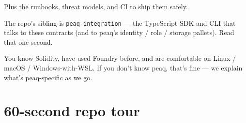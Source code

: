 \documentclass[11pt,a4paper]{article}
\begin{document}
Plus the runbooks, threat models, and CI to ship them safely.

The repo's sibling is \texttt{peaq-integration} --- the TypeScript SDK and CLI that talks to these contracts (and to peaq's identity / role / storage pallets). Read that one second.

\begin{infobox}[title=Assumptions]
You know Solidity, have used Foundry before, and are comfortable on Linux / macOS / Windows-with-WSL. If you don't know peaq, that's fine --- we explain what's peaq-specific as we go.
\end{infobox}

\section{60-second repo tour}
\end{document}
